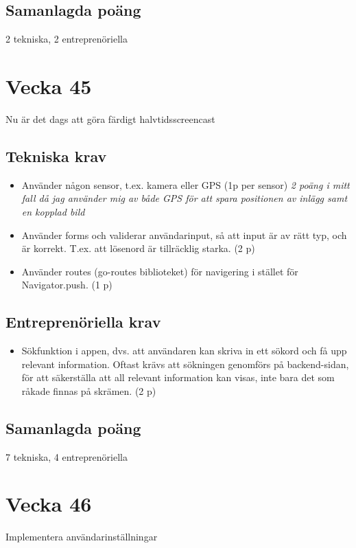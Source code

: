 \documentclass{TDP003mall}
\begin{document}
\subsection{Samanlagda poäng}
2 tekniska, 2 entreprenöriella


\section{Vecka 45}
Nu är det dags att göra färdigt halvtidsscreencast

\subsection{Tekniska krav}
\begin{itemize}
    \item Använder någon sensor, t.ex. kamera eller GPS (1p per sensor)
    \textit{2 poäng i mitt fall då jag använder mig av både GPS för att spara positionen av inlägg samt en kopplad bild}
    \item Använder forms och validerar användarinput, så att input är av rätt typ, och är korrekt. T.ex. att lösenord är tillräcklig starka. (2 p)
    \item Använder routes (go-routes biblioteket) för navigering i stället för Navigator.push. (1 p)    
\end{itemize}

\subsection{Entreprenöriella krav}
\begin{itemize}
    \item Sökfunktion i appen, dvs. att användaren kan skriva in ett sökord och få upp relevant information. Oftast krävs att sökningen genomförs på backend-sidan, för att säkerställa att all relevant information kan visas, inte bara det som råkade finnas på skrämen. (2 p)
\end{itemize}

\subsection{Samanlagda poäng}
7 tekniska, 4 entreprenöriella

\section{Vecka 46}
Implementera användarinställningar
\end{document}
